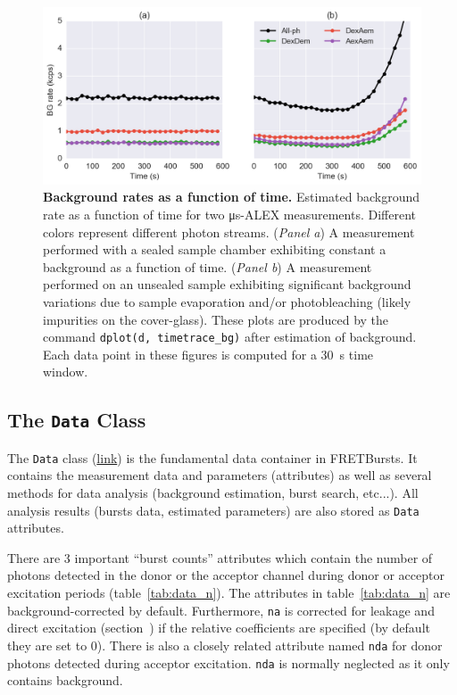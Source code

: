 \documentclass[10pt,letterpaper]{article}
\begin{document}
\begin{figure}[h!]
\begin{center}
\includegraphics[width=0.91\columnwidth]{figures/background_timetrace/background_timetrace}
\caption{\label{fig:bg_timetrace} \textbf{Background rates as a function of time.}
Estimated background rate as a function of time for two μs-ALEX measurements.
Different colors represent different photon streams.
(\textit{Panel a}) A measurement performed with a sealed sample chamber
exhibiting constant a background as a function of time.
(\textit{Panel b}) A measurement performed on an unsealed sample exhibiting
significant background variations due to sample evaporation and/or
photobleaching (likely impurities on the cover-glass).
These plots are produced by the command
\texttt{dplot(d, timetrace\_bg)} after estimation of background.
Each data point in these figures is computed for a 30~s time window.%
}
\end{center}
\end{figure}


\subsection*{The \texttt{Data} Class}
\label{sec:data_intro}

The \verb|Data| class
(\href{http://fretbursts.readthedocs.org/en/latest/data_class.html}{link})
is the fundamental data container in FRETBursts. It contains the
measurement data and parameters (attributes) as well as several methods
for data analysis (background estimation, burst search, etc...).
All analysis results (bursts data, estimated parameters) are also stored
as \verb|Data| attributes.

There are 3 important ``burst counts'' attributes which contain
the number of photons detected in the donor or the acceptor channel
during donor or acceptor excitation periods (table~\ref{tab:data_n}).
The attributes in table~\ref{tab:data_n} are background-corrected by default.
Furthermore, \verb|na| is corrected for leakage and direct excitation
(section~) if the relative coefficients are specified
(by default they are set to 0).
There is also a closely related attribute named \verb|nda| for donor photons detected
during acceptor excitation. \verb|nda| is normally neglected as it only contains
background.
\end{document}
